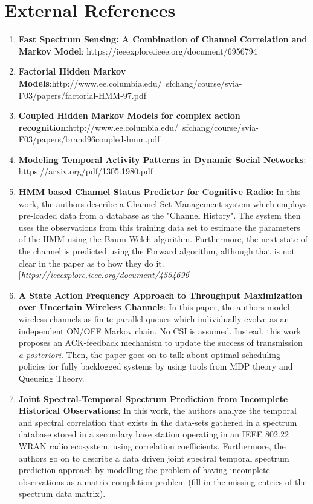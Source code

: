 \documentclass[12pt, draftcls, onecolumn]{IEEEtran}
\begin{document}
\section{External References}
\begin{enumerate}
    \item \textbf{Fast Spectrum Sensing: A Combination of Channel Correlation and Markov Model}: https://ieeexplore.ieee.org/document/6956794
    \item \textbf{Factorial Hidden Markov Models}:\newline http://www.ee.columbia.edu/~sfchang/course/svia-F03/papers/factorial-HMM-97.pdf
    \item \textbf{Coupled Hidden Markov Models for complex action recognition}:\newline http://www.ee.columbia.edu/~sfchang/course/svia-F03/papers/brand96coupled-hmm.pdf
    \item \textbf{Modeling Temporal Activity Patterns in Dynamic Social
    Networks}: \\https://arxiv.org/pdf/1305.1980.pdf
    \item \textbf{HMM based Channel Status Predictor for Cognitive Radio}: In this work, the authors describe a Channel Set Management system which employs pre-loaded data from a database as the "Channel History". The system then uses the observations from this training data set to estimate the parameters of the HMM using the Baum-Welch algorithm. Furthermore, the next state of the channel is predicted using the Forward algorithm, although that is not clear in the paper as to how they do it. [\textit{https://ieeexplore.ieee.org/document/4554696}]
    \item \textbf{A State Action Frequency Approach to Throughput Maximization over Uncertain Wireless Channels}: In this paper, the authors model wireless channels as finite parallel queues which individually evolve as an independent ON/OFF Markov chain. No CSI is assumed. Instead, this work proposes an ACK-feedback mechanism to update the success of transmission \textit{a posteriori}. Then, the paper goes on to talk about optimal scheduling policies for fully backlogged systems by using tools from MDP theory and Queueing Theory.
    \item \textbf{Joint Spectral-Temporal Spectrum Prediction from Incomplete Historical Observations}: In this work, the authors analyze the temporal and spectral correlation that exists in the data-sets gathered in a spectrum database stored in a secondary base station operating in an IEEE 802.22 WRAN radio ecosystem, using correlation coefficients. Furthermore, the authors go on to describe a data driven joint spectral temporal spectrum prediction approach by modelling the problem of having incomplete observations as a matrix completion problem (fill in the missing entries of the spectrum data matrix).\newline

\end{enumerate}
\end{document}
